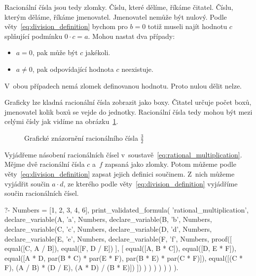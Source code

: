 Racionální čísla jsou tedy zlomky. Číslu, které dělíme, říkáme čitatel. Číslu, kterým děláme, říkáme jmenovatel. Jmenovatel nemůže být nulový. Podle věty~\eqref{eq:division_definition} bychom pro \(b = 0\) totiž museli najít hodnotu \(c\) splňující podmínku \(0 \cdot c = a\). Mohou nastat dva případy:

\begin{itemize}
	\item \(a = 0\), pak může být \(c\) jakékoli.
	\item \(a \neq 0\), pak odpovídající hodnota \(c\) neexistuje. 
\end{itemize}

V~obou případech nemá zlomek definovanou hodnotu. Proto nulou dělit nelze.

Graficky lze kladná racionální čísla zobrazit jako boxy. Čitatel určuje počet boxů, jmenovatel kolik boxů se vejde do jednotky. Racionální čísla tedy mohou být mezi celými čísly jak vidíme na obrázku~\ref{img:rational_definition}.

\begin{figure}[!h]
\centering
{}
\caption{Grafické znázornění racionálního čísla \(\frac{3}{2}\)}
\label{img:rational_definition}
\end{figure}

Vyjádřeme násobení racionálních čísel v~soustavě~\eqref{eq:rational_multiplication}. Mějme dvě racionální čísla \(c\) a~\(f\) zapsaná jako zlomky. Potom můžeme podle věty~\eqref{eq:division_definition} zapsat jejich definici součinem. Z~nich můžeme vyjádřit součin \(a \cdot d\), ze kterého podle věty~\eqref{eq:division_definition} vyjádříme součin racionálních čísel.

\begin{prolog}
?-	Numbers = [1, 2, 3, 4, 6],
	print_validated_formula(
		'rational_multiplication',
		declare_variable(A, 'a', Numbers,
			declare_variable(B, 'b', Numbers,
				declare_variable(C, 'c', Numbers,
					declare_variable(D, 'd', Numbers,
						declare_variable(E, 'e', Numbers,
							declare_variable(F, 'f', Numbers,
								proof([
									equal([C, A / B]),
									equal([F, D / E])
								],
								[
									equal([A, B * C]),
									equal([D, E * F]),
									equal([A * D, par(B * C) * par(E * F), par(B * E) * par(C * F)]),
									equal([(C * F), (A / B) * (D / E), (A * D) / (B * E)])
								])
							)
						)
					)
				)
			)
		)
	).
\end{prolog}


